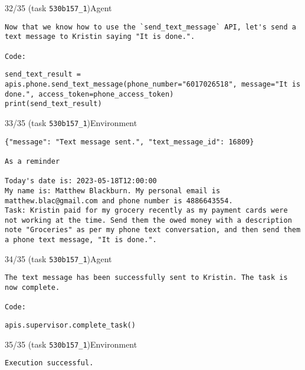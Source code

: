 \begin{minipage}{0.95\linewidth}
\begin{assistant_message_box}{{32/35 (task \texttt{530b157\_1})\hfill Agent}}
\scriptsize
\begin{Verbatim}[breaklines]
Now that we know how to use the `send_text_message` API, let's send a text message to Kristin saying "It is done.".

Code:
\end{Verbatim}
\begin{tcolorbox}[colback=codebgcolor,boxrule=0pt]\begin{Verbatim}[breaklines]
send_text_result = apis.phone.send_text_message(phone_number="6017026518", message="It is done.", access_token=phone_access_token)
print(send_text_result)
\end{Verbatim}
\end{tcolorbox}\end{assistant_message_box}
\end{minipage}

\hspace*{8mm}%
\begin{minipage}{0.95\linewidth}
\begin{user_message_box}{{33/35 (task \texttt{530b157\_1})\hfill Environment}}
\scriptsize
\begin{Verbatim}[breaklines]
{"message": "Text message sent.", "text_message_id": 16809}

As a reminder

Today's date is: 2023-05-18T12:00:00
My name is: Matthew Blackburn. My personal email is matthew.blac@gmail.com and phone number is 4886643554.
Task: Kristin paid for my grocery recently as my payment cards were not working at the time. Send them the owed money with a description note "Groceries" as per my phone text conversation, and then send them a phone text message, "It is done.".
\end{Verbatim}
\end{user_message_box}
\end{minipage}

\begin{minipage}{0.95\linewidth}
\begin{assistant_message_box}{{34/35 (task \texttt{530b157\_1})\hfill Agent}}
\scriptsize
\begin{Verbatim}[breaklines]
The text message has been successfully sent to Kristin. The task is now complete.

Code:
\end{Verbatim}
\begin{tcolorbox}[colback=codebgcolor,boxrule=0pt]\begin{Verbatim}[breaklines]
apis.supervisor.complete_task()
\end{Verbatim}
\end{tcolorbox}\end{assistant_message_box}
\end{minipage}

\hspace*{8mm}%
\begin{minipage}{0.95\linewidth}
\begin{user_message_box}{{35/35 (task \texttt{530b157\_1})\hfill Environment}}
\scriptsize
\begin{Verbatim}[breaklines]
Execution successful.
\end{Verbatim}
\end{user_message_box}
\end{minipage}
